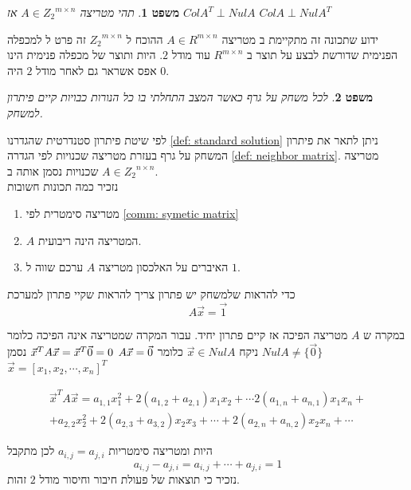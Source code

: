 \documentclass[12pt,twoside]{article}
\newtheorem{theorem}{משפט}[section]
\begin{document}
\begin{theorem}
    \label{the: Nul A and Col AT}
    תהי מטריצה 
    $A \in {Z_2}^{m \times n }$
    אז 
    $ColA^T \perp Nul A$
    $ColA \perp Nul A^T$
\end{theorem}

ידוע שתכונה זה מתקיימת 
ב
מטריצה 
$A \in R^{m \times n}$
ההוכח 
ל
$ {Z_2}^{m \times n}$
זה
פרט ל
למכפלה הפנימית 
שדורשת 
לבצע על תוצר 
ב
$R^{m \times n}$
עוד 
מודל 
$2$.
היות ותוצר של מכפלה פנימית הינו אפס 
אשראר גם לאחר מודל 
$2$
היה 
$0$.


\begin{theorem}
    \label{thrm: clean game has solution}
    לכל משחק על גרף כאשר המצב התחלתי בו כל הנורות כבויות קיים פיתרון למשחק.
\end{theorem}
לפי 
שיטת פיתרון סטנדרטית 
שהגדרנו
\ref{def: standard solution}
ניתן לתאר את פיתרון המשחק על גרף בעזרת מטריצה
שכנויות לפי הגדרה 
\ref{def: neighbor matrix}.
מטריצה שכנויות
נסמן אותה ב
$A \in {Z_2}^{n \times n}$.
\\
נזכיר כמה תכונות חשובות
\begin{enumerate}
    \item 
    מטריצה סימטרית לפי
    \ref{comm: symetic matrix}
    \item 
    $A$
    המטריצה הינה ריבועית.
    \item 
    האיברים על האלכסון
    מטריצה 
    $A$
    ערכם שווה ל
    $1$.
\end{enumerate}

כדי להראות שלמשחק יש פתרון 
צריך להראות שקיי פתרון למערכת 
\[A \vec{x} = \vec{1} \]

במקרה ש 
$A$
מטריצה הפיכה אז קיים פתרון יחיד.
עבור המקרה שמטריצה אינה הפיכה 
כלומר 
$Nul A \neq \{ \vec{0}\}$
ניקח 
$\vec{x} \in Nul A$
כלומר 
$A\vec{x} = \vec{0} \\$
$\vec{x}^T A \vec{x} = \vec{x}^T\vec{0} = 0 \\$
נסמן 
$\vec{x} = [x_1, x_2, \cdots, x_n]^T$

\begin{multline}
    \label{eq: quadratic form}
        \vec{x}^T A \vec{x} = a_{1,1}x_1^2 + 2(a_{1,2} + a_{2,1})x_1x_2 + \cdots 2(a_{1,n} + a_{n,1})x_1x_n + \\
        + a_{2,2}x_2^2 +  2(a_{2,3} + a_{3,2})x_2x_3 + \cdots  + 2(a_{2,n} + a_{n,2})x_2x_n + \cdots
\end{multline}

היות ומטריצה סימטריות
$a_{i,j} = a_{j,i}$
לכן
מתקבל
\[a_{i,j} - a_{j,i} = a_{i,j} + \cdots + a_{j,i} = 1 \]
נזכיר כי תוצאות של פעולת חיבור וחיסור מודל 
$2$
זהות.
\end{document}
